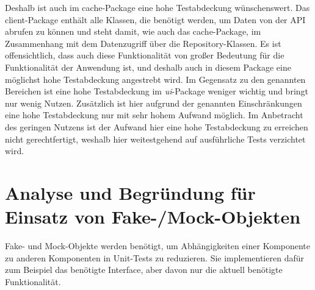 \documentclass[12pt]{article}
\begin{document}
Deshalb ist  auch im cache-Package eine hohe Testabdeckung wünschenswert.
\newline
\newline
Das client-Package enthält alle Klassen, die benötigt werden, um Daten von der API abrufen zu können und steht damit, wie auch das cache-Package, im Zusammenhang mit dem Datenzugriff über die Repository-Klassen.
Es ist offensichtlich, dass auch diese Funktionalität von großer Bedeutung für die Funktionalität der Anwendung ist, und deshalb auch in diesem Package eine möglichst hohe Testabdeckung angestrebt wird.
\newline
\newline
Im Gegensatz zu den genannten Bereichen ist eine hohe Testabdeckung im \textit{ui}-Package weniger wichtig und bringt nur wenig Nutzen. 
Zusätzlich ist hier aufgrund der genannten Einschränkungen eine hohe Testabdeckung nur mit sehr hohem Aufwand möglich.
Im Anbetracht des geringen Nutzens ist der Aufwand hier eine hohe Testabdeckung zu erreichen nicht gerechtfertigt, weshalb hier weitestgehend auf ausführliche Tests verzichtet wird.



\newpage
\section{Analyse und Begründung für Einsatz von Fake-/Mock-Objekten}

Fake- und Mock-Objekte werden benötigt, um Abhängigkeiten einer Komponente zu anderen Komponenten in Unit-Tests zu reduzieren.
Sie implementieren dafür zum Beispiel das benötigte Interface, aber davon nur die aktuell benötigte Funktionalität.

\end{document}
